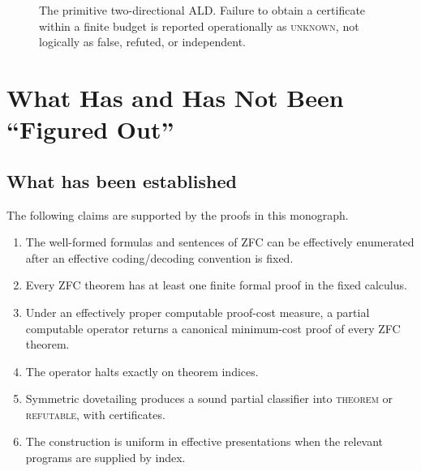 \documentclass[11pt,oneside]{book}
\theoremstyle{definition}
\theoremstyle{remark}
\begin{document}
\begin{figure}[ht]
\centering
{}
\caption{The primitive two-directional ALD. Failure to obtain a certificate within a finite budget is reported operationally as \textsc{unknown}, not logically as false, refuted, or independent.}
\label{fig:ald}
\end{figure}

\chapter{What Has and Has Not Been ``Figured Out''}
\section{What has been established}
The following claims are supported by the proofs in this monograph.
\begin{enumerate}
\item The well-formed formulas and sentences of ZFC can be effectively enumerated after an effective coding/decoding convention is fixed.
\item Every ZFC theorem has at least one finite formal proof in the fixed calculus.
\item Under an effectively proper computable proof-cost measure, a partial computable operator returns a canonical minimum-cost proof of every ZFC theorem.
\item The operator halts exactly on theorem indices.
\item Symmetric dovetailing produces a sound partial classifier into \textsc{theorem} or \textsc{refutable}, with certificates.
\item The construction is uniform in effective presentations when the relevant programs are supplied by index.
\end{enumerate}
\end{document}
